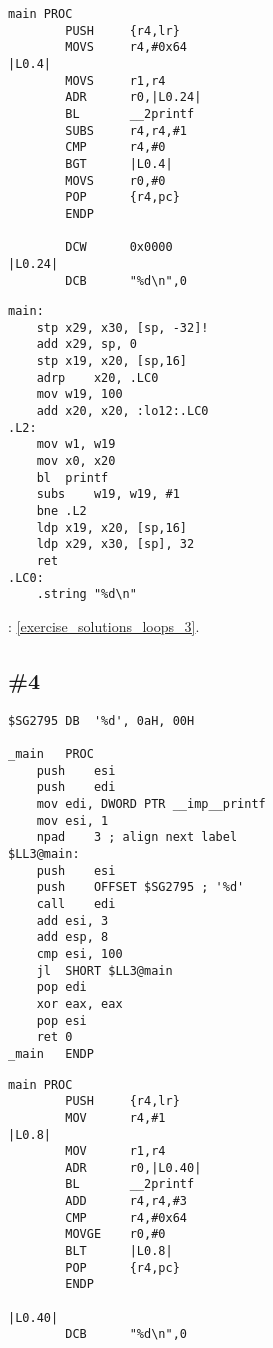 \begin{lstlisting}[caption=\NonOptimizingKeilVI (\ThumbMode)]
main PROC
        PUSH     {r4,lr}
        MOVS     r4,#0x64
|L0.4|
        MOVS     r1,r4
        ADR      r0,|L0.24|
        BL       __2printf
        SUBS     r4,r4,#1
        CMP      r4,#0
        BGT      |L0.4|
        MOVS     r0,#0
        POP      {r4,pc}
        ENDP

        DCW      0x0000
|L0.24|
        DCB      "%d\n",0
\end{lstlisting}

\begin{lstlisting}[caption=\Optimizing GCC 4.9 (ARM64)]
main:
	stp	x29, x30, [sp, -32]!
	add	x29, sp, 0
	stp	x19, x20, [sp,16]
	adrp	x20, .LC0
	mov	w19, 100
	add	x20, x20, :lo12:.LC0
.L2:
	mov	w1, w19
	mov	x0, x20
	bl	printf
	subs	w19, w19, #1
	bne	.L2
	ldp	x19, x20, [sp,16]
	ldp	x29, x30, [sp], 32
	ret
.LC0:
	.string	"%d\n"
\end{lstlisting}



: \ref{exercise_solutions_loops_3}.

\subsection{\Exercise \#4}
\label{exercise_loops_4}

\WhatThisCodeDoes

\begin{lstlisting}[caption=\Optimizing MSVC 2010]
$SG2795	DB	'%d', 0aH, 00H

_main	PROC
	push	esi
	push	edi
	mov	edi, DWORD PTR __imp__printf
	mov	esi, 1
	npad	3 ; align next label
$LL3@main:
	push	esi
	push	OFFSET $SG2795 ; '%d'
	call	edi
	add	esi, 3
	add	esp, 8
	cmp	esi, 100
	jl	SHORT $LL3@main
	pop	edi
	xor	eax, eax
	pop	esi
	ret	0
_main	ENDP
\end{lstlisting}

\begin{lstlisting}[caption=\NonOptimizingKeilVI (\ARMMode)]
main PROC
        PUSH     {r4,lr}
        MOV      r4,#1
|L0.8|
        MOV      r1,r4
        ADR      r0,|L0.40|
        BL       __2printf
        ADD      r4,r4,#3
        CMP      r4,#0x64
        MOVGE    r0,#0
        BLT      |L0.8|
        POP      {r4,pc}
        ENDP

|L0.40|
        DCB      "%d\n",0
\end{lstlisting}

